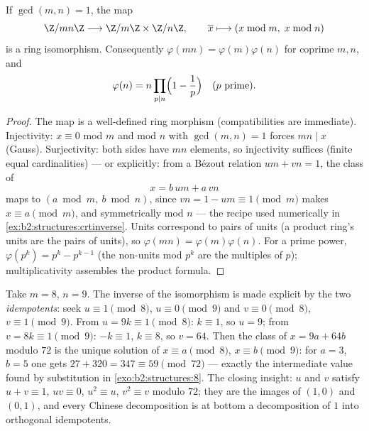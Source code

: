 \begin{theorem}\label{thm:b2:structures:crt}
If $\gcd(m, n) = 1$, the map
\[
\Z/mn\Z \longrightarrow \Z/m\Z \times \Z/n\Z,
\qquad
\overline{x} \longmapsto (x \bmod m,\; x \bmod n)
\]
is a ring isomorphism. Consequently
$\varphi(mn) = \varphi(m)\varphi(n)$ for coprime $m, n$, and
\[
\varphi(n) = n \prod_{p \mid n} \Bigl(1 - \frac 1p\Bigr)
\quad (p \text{ prime}).
\]
\end{theorem}

\begin{proof}
The map is a well-defined ring morphism (compatibilities are
immediate). Injectivity: $x \equiv 0$ mod $m$ and mod $n$ with
$\gcd(m,n) = 1$ forces $mn \mid x$ (Gauss). Surjectivity: both sides
have $mn$ elements, so injectivity suffices (finite equal
cardinalities) --- or explicitly: from a B\'ezout relation $um +
vn = 1$, the class of
\[
x = b\,um + a\,vn
\]
maps to $(a \bmod m,\ b \bmod n)$, since $vn = 1 - um \equiv 1
\pmod m$ makes $x \equiv a \pmod m$, and symmetrically mod $n$
--- the recipe used numerically in
\cref{ex:b2:structures:crtinverse}. Units correspond to pairs of units (a product ring's
units are the pairs of units), so $\varphi(mn) =
\varphi(m)\varphi(n)$. For a prime power, $\varphi(p^k) = p^k -
p^{k-1}$ (the non-units mod $p^k$ are the multiples of $p$);
multiplicativity assembles the product formula.
\end{proof}

\begin{example}\label{ex:b2:structures:crtinverse}
Take $m = 8$, $n = 9$. The inverse of the isomorphism is made
explicit by the two \emph{idempotents}: seek $u \equiv 1 \pmod 8$,
$u \equiv 0 \pmod 9$ and $v \equiv 0 \pmod 8$, $v \equiv 1 \pmod
9$. From $u = 9k \equiv 1 \pmod 8$: $k \equiv 1$, so $u = 9$; from
$v = 8k \equiv 1 \pmod 9$: $-k \equiv 1$, $k \equiv 8$, so $v =
64$. Then the class of $x = 9a + 64b$ modulo $72$ is the unique
solution of $x \equiv a \pmod 8$, $x \equiv b \pmod 9$: for $a =
3$, $b = 5$ one gets $27 + 320 = 347 \equiv 59 \pmod{72}$ ---
exactly the intermediate value found by substitution in
\cref{exo:b2:structures:8}. The closing insight: $u$ and $v$
satisfy $u + v \equiv 1$, $uv \equiv 0$, $u^2 \equiv u$, $v^2
\equiv v$ modulo $72$; they are the images of $(1, 0)$ and $(0,
1)$, and every Chinese decomposition is at bottom a decomposition
of $1$ into orthogonal idempotents.
\end{example}


